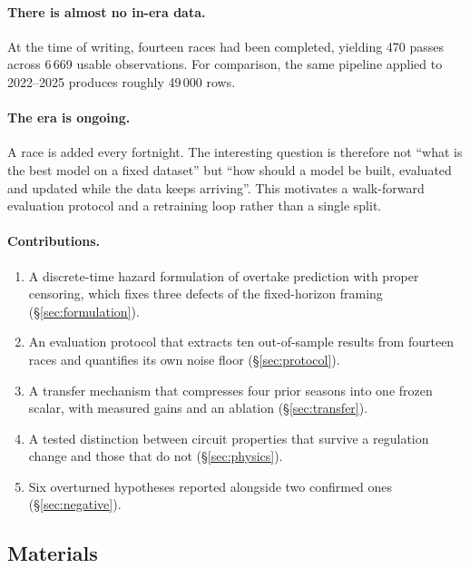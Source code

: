 \documentclass[11pt,a4paper]{article}
\begin{document}
\paragraph{There is almost no in-era data.} At the time of writing, fourteen
races had been completed, yielding 470 passes across 6\,669 usable
observations. For comparison, the same pipeline applied to
2022--2025 produces roughly 49\,000 rows.

\paragraph{The era is ongoing.} A race is added every fortnight. The interesting
question is therefore not ``what is the best model on a fixed dataset'' but
``how should a model be built, evaluated and updated while the data keeps
arriving''. This motivates a walk-forward evaluation protocol and a retraining
loop rather than a single split.

\paragraph{Contributions.}
\begin{enumerate}[label=(\roman*)]
  \item A discrete-time hazard formulation of overtake prediction with proper
        censoring, which fixes three defects of the fixed-horizon framing
        (\S\ref{sec:formulation}).
  \item An evaluation protocol that extracts ten out-of-sample results from
        fourteen races and quantifies its own noise floor (\S\ref{sec:protocol}).
  \item A transfer mechanism that compresses four prior seasons into one frozen
        scalar, with measured gains and an ablation (\S\ref{sec:transfer}).
  \item A tested distinction between circuit properties that survive a
        regulation change and those that do not (\S\ref{sec:physics}).
  \item Six overturned hypotheses reported alongside two confirmed ones
        (\S\ref{sec:negative}).
\end{enumerate}

\subsection*{Materials}
\end{document}
